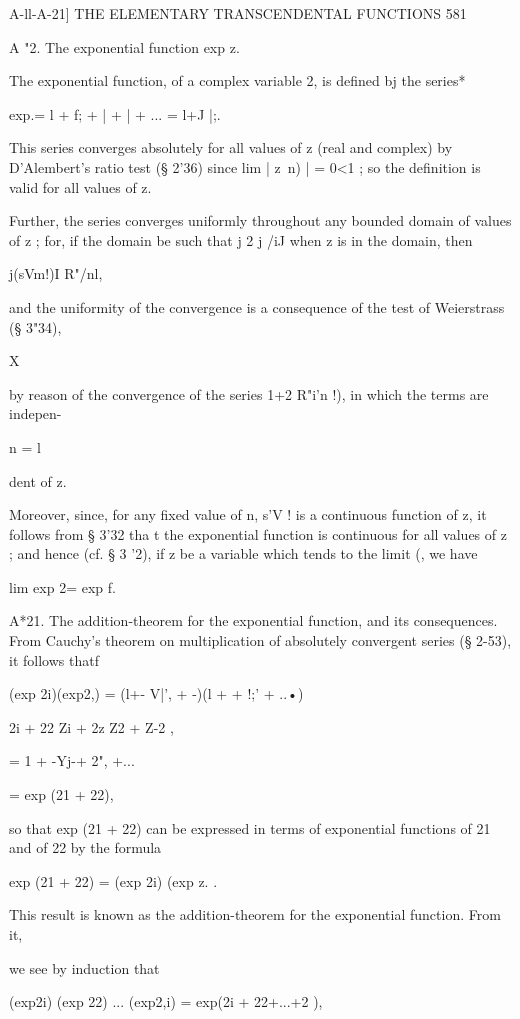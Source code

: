 A-ll-A-21] THE ELEMENTARY TRANSCENDENTAL FUNCTIONS 581 

A "2. The exponential function exp z. 

The exponential function, of a complex variable 2, is defined bj the series* 

exp.= l + f; + |  + |  + ... = l+J |;. 

This series converges absolutely for all values of z (real and complex) by D'Alembert's 
ratio test (§ 2'36) since lim |  z\ n) | = 0<1 ; so the definition is valid for all values of z. 

Further, the series converges uniformly throughout any bounded domain of values of z ; 
for, if the domain be such that j 2 j   /iJ when z is in the domain, then 

j(sVm!)I  R"/nl, 

and the uniformity of the convergence is a consequence of the test of Weierstrass (§ 3"34), 

X 

by reason of the convergence of the series 1+2  R"i'n !), in which the terms are indepen- 

n = l 

dent of z. 

Moreover, since, for any fixed value of n, s'V  ! is a continuous function of z, it follows 
from § 3'32 tha t the exponential function is continuous for all values of z ; and hence 
(cf. § 3 '2), if z be a variable which tends to the limit (, we have 

lim exp 2= exp f. 

A*21. The addition-theorem for the exponential function, and its consequences. 
From Cauchy's theorem on multiplication of absolutely convergent series (§ 2-53), it 
follows thatf 

(exp 2i)(exp2,) = (l+- V|', + -)(l +   + !;' + ..•) 

2i + 22 Zi  + 2z Z2 + Z-2  , 

= 1 + -Yj-+ 2", +... 

= exp (21 + 22), 

so that exp (21 + 22) can be expressed in terms of exponential functions of 21 and of 22 by 
the formula 

exp (21 + 22) = (exp 2i) (exp z. . 

This result is known as the addition-theorem for the exponential function. From it, 

we see by induction that 

(exp2i) (exp 22) ... (exp2,i) = exp(2i + 22+...+2 ), 


